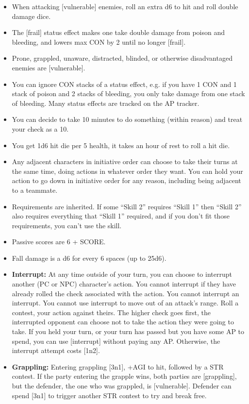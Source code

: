 \documentclass{article}
\begin{document}
\begin{multicols}{2}
  \begin{itemize}

    \item When attacking [vulnerable] enemies, roll an extra d6 to hit and roll double damage dice.
    \item The [frail] status effect makes one take double damage from poison and bleeding, and lowers max CON by 2 until no longer [frail].
    \item Prone, grappled, unaware, distracted, blinded, or otherwise disadvantaged enemies are [vulnerable].
    \item You can ignore CON stacks of a status effect, e.g. if you have 1 CON and 1 stack of poison and 2 stacks of bleeding, you only take damage from one stack of bleeding. Many status effects are tracked on the AP tracker.
    \item You can decide to take 10 minutes to do something (within reason) and treat your check as a 10.
    \item You get 1d6 hit die per 5 health, it takes an hour of rest to roll a hit die.
    \item Any adjacent characters in initiative order can choose to take their turns at the same time, doing actions in whatever order they want. You can hold your action to go down in initiative order for any reason, including being adjacent to a teammate.
    \item Requirements are inherited. If some ``Skill 2'' requires ``Skill 1'' then ``Skill 2'' also requires everything that ``Skill 1'' required, and if you don’t fit those requirements, you can’t use the skill.
    \item Passive scores are 6 + SCORE.
    \item Fall damage is a d6 for every 6 spaces (up to 25d6).

  \end{itemize}
\end{multicols}
\begin{itemize}
  \item \textbf{Interrupt:}
        At any time outside of your turn, you can choose to interrupt another (PC or NPC) character's action. You cannot interrupt if they have already rolled the check associated with the action. You cannot interrupt an interrupt. You cannot use interrupt to move out of an attack's range. Roll a contest, your action against theirs. The higher check goes first, the interrupted opponent can choose not to take the action they were going to take. If you held your turn, or your turn has passed but you have some AP to spend, you can use [interrupt] without paying any AP. Otherwise, the interrupt attempt costs [1n2].
  \item \textbf{Grappling:} Entering grappling [3n1], +AGI to hit, followed by a STR contest. If the party entering the grapple wins, both parties are [grappling], but the defender, the one who was grappled, is [vulnerable]. Defender can spend [3n1] to trigger another STR contest to try and break free.
\end{itemize}

\end{document}
